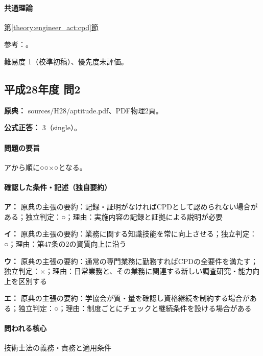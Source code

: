 \paragraph{共通理論} \hyperref[theory:engineer_act:cpd]{第\ref*{theory:engineer_act:cpd}節}

\par 参考：\cite{cpd_v2}。

\par 難易度 1（校準初稿）、優先度未評価。

\subsection{平成28年度 問2}
\label{q:h28-reg-apt-02}

\noindent\textbf{原典：} sources/H28/aptitude.pdf、PDF物理2頁。

\textbf{公式正答：} 3（single）。

\paragraph{問題の要旨} アから順に○○×○となる。

\paragraph{確認した条件・記述（独自要約）}\mbox{}\par

\noindent\textbf{ア：} 原典の主張の要約：記録・証明がなければCPDとして認められない場合がある；独立判定：○；理由：実施内容の記録と証拠による説明が必要\par

\noindent\textbf{イ：} 原典の主張の要約：業務に関する知識技能を常に向上させる；独立判定：○；理由：第47条の2の資質向上に沿う\par

\noindent\textbf{ウ：} 原典の主張の要約：通常の専門業務に勤務すればCPDの全要件を満たす；独立判定：×；理由：日常業務と、その業務に関連する新しい調査研究・能力向上を区別する\par

\noindent\textbf{エ：} 原典の主張の要約：学協会が質・量を確認し資格継続を制約する場合がある；独立判定：○；理由：制度ごとにチェックと継続条件を設ける場合がある\par

\paragraph{問われる核心} 技術士法の義務・責務と適用条件

